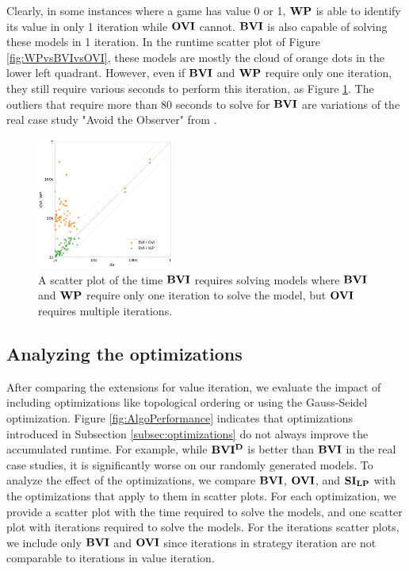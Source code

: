 Clearly, in some instances where a game has value 0 or 1, $\mathbf{WP}$ is able to identify its value in only 1 iteration while $\mathbf{OVI}$ cannot.
$\BVI$ is also capable of solving these models in 1 iteration.
In the runtime scatter plot of Figure \ref{fig:WPvsBVIvsOVI}, these models are mostly the cloud of orange dots in the lower left quadrant.
However, even if $\BVI$ and $\mathbf{WP}$ require only one iteration, they still require various seconds to perform this iteration, as Figure \ref{fig:BVI1IterationTime}.
The outliers that require more than 80 seconds to solve for $\BVI$ are variations of the real case study "Avoid the Observer" from \cite{cav20}.

\begin{figure}[h!]
    \centering
    \includegraphics[width=0.4\textwidth]{figures/BVI_1_Iteration_vs_OVI.jpg}
    \caption[Time $\BVI$ requires solving models where it only needs one iteration]{
        A scatter plot of the time $\BVI$ requires solving models where $\BVI$ and $\mathbf{WP}$ require only one iteration to solve the model, 
        but $\mathbf{OVI}$ requires multiple iterations. 
    }
    \label{fig:BVI1IterationTime}
\end{figure}
\FloatBarrier

\subsection{Analyzing the optimizations}
After comparing the extensions for value iteration, we evaluate the impact of including optimizations like topological ordering or using the Gauss-Seidel optimization.
Figure \ref{fig:AlgoPerformance} indicates that optimizations introduced in Subsection \ref{subsec:optimizations} do not always improve the accumulated runtime. 
For example, while $\mathbf{BVI^D}$ is better than $\BVI$ in the real case studies, it is significantly worse on our randomly generated models.
To analyze the effect of the optimizations, we compare $\BVI$, $\mathbf{OVI}$, and $\mathbf{SI_{LP}}$ with the optimizations that apply to them in scatter plots.
For each optimization, we provide a scatter plot with the time required to solve the models, and one scatter plot with iterations required to solve the models.
For the iterations scatter plots, we include only $\BVI$ and $\mathbf{OVI}$ since iterations in strategy iteration are not comparable to iterations in value iteration.

